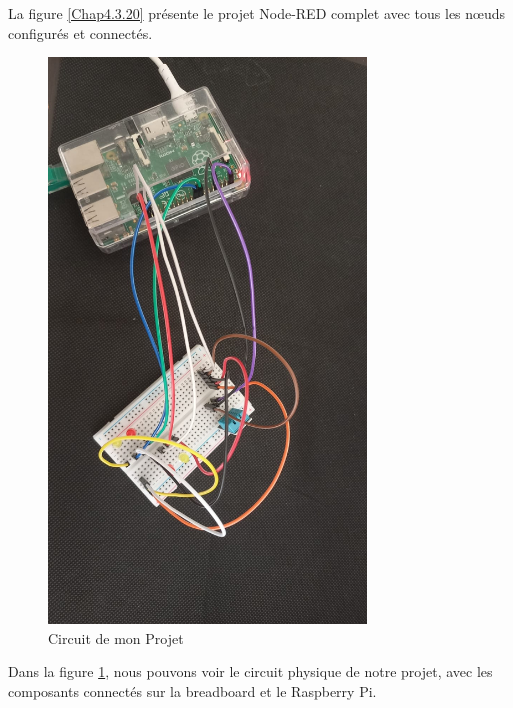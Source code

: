 La figure \ref{Chap4.3.20} présente le projet Node-RED complet avec tous les nœuds configurés et connectés.

\begin{figure}[H]
\centering
\includegraphics[height=15cm]{Images/Node-11.jpg}
\caption{Circuit de mon Projet}
\label{Chap4.3.21}
\end{figure}

Dans la figure \ref{Chap4.3.21}, nous pouvons voir le circuit physique de notre projet, avec les composants connectés sur la breadboard et le Raspberry Pi.

